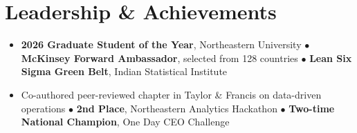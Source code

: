 \documentclass[letterpaper,10pt]{article}
\newcommand{\resumeItem}[1]{\item\small{{#1 \vspace{-1pt}}}}
\newcommand{\resumeItemListStart}{\begin{itemize}[leftmargin=0.15in, label=$\bullet$]}
\newcommand{\resumeItemListEnd}{\end{itemize}\vspace{-2pt}}
\begin{document}
\section{Leadership \& Achievements}
\resumeItemListStart
\resumeItem{\textbf{2026 Graduate Student of the Year}, Northeastern University $\bullet$ \textbf{McKinsey Forward Ambassador}, selected from 128 countries $\bullet$ \textbf{Lean Six Sigma Green Belt}, Indian Statistical Institute}
\resumeItem{Co-authored peer-reviewed chapter in Taylor \& Francis on data-driven operations $\bullet$ \textbf{2nd Place}, Northeastern Analytics Hackathon $\bullet$ \textbf{Two-time National Champion}, One Day CEO Challenge}
\resumeItemListEnd
\end{document}

